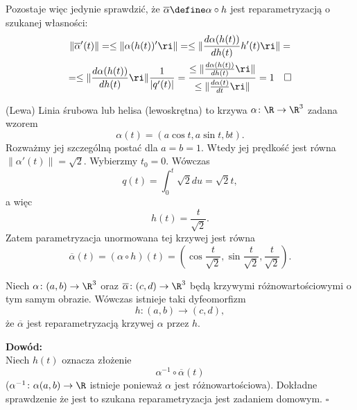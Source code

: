 \begin{frame}[<+->]
Pozostaje więc jedynie sprawdzić, że $\overline{\alpha}\define\alpha\circ h$ jest reparametryzacją o szukanej własności:
\pause\begin{multline*}
\|\overline{\alpha}'(t)\|=\le\|\alpha(h(t))'\ri\|=\le\|\frac{d\alpha(h(t))}{dh(t)}h'(t)\ri\|=\\=\le\|\frac{d\alpha(h(t))}{dh(t)}\ri\|\frac{1}{|q'(t)|}=\frac{\le\|\frac{d\alpha(h(t))}{dh(t)}\ri\|}{\le\|\frac{d\alpha(t)}{dt}\ri\|}=1\quad\square
\end{multline*}
\end{frame}
\begin{frame}
\begin{przyklad}
(Lewa) Linia śrubowa lub helisa (lewoskrętna) to krzywa $\alpha\colon \R\to 
\R^3$ zadana wzorem
\[\alpha(t)=(a\cos{t},a\sin{t},bt).\] \pause
Rozważmy jej szczególną postać dla $a=b=1$. Wtedy jej prędkość jest równa 
$\|\alpha'(t)\|=\sqrt{2}$. Wybierzmy $t_0=0$. Wówczas \[q(t)=\int_0^t\sqrt{2} 
du=\sqrt{2}t,\] a więc \[h(t)=\frac{t}{\sqrt{2}}.\] \pause Zatem parametryzacja 
unormowana tej krzywej jest równa 
\[\overline{\alpha}(t)=(\alpha\circ h)(t)= 
\left(\cos{\frac{t}{\sqrt{2}}},\sin{\frac{t}{\sqrt{2}}},\frac{t}{\sqrt{2}} 
\right)\!.\]
\end{przyklad}

\end{frame}
\begin{frame}[<+->]

\begin{center}
\begin{tikzpicture}[y=0.80pt, x=0.8pt,scale=0.7,yscale=-1, inner sep=0pt, outer sep=0pt]

\end{tikzpicture}
\end{center}
\end{frame}
\begin{frame}

\begin{lemat}
Niech $\alpha\colon (a,b)\to \R^3$ oraz $\overline{\alpha}\colon (c,d)\to \R^3$ będą krzywymi różnowartościowymi o tym samym obrazie. Wówczas istnieje taki dyfeomorfizm \[h\colon (a,b)\to (c,d),\] że $\overline{\alpha}$ jest reparametryzacją krzywej $\alpha$ przez $h$.
\end{lemat}
\pause \textcolor{ared}{\textbf{Dowód:}}\\
Niech $h(t)$ oznacza złożenie \[\alpha^{-1}\circ \overline{\alpha} (t)\] 
($\alpha^{-1}\colon \alpha(a,b)\to \R$ istnieje ponieważ $\alpha$ jest 
r\'ożnowartościowa). Dokładne sprawdzenie że jest to szukana reparametryzacja 
jest zadaniem domowym.
\hfill $\square$

\end{frame}
